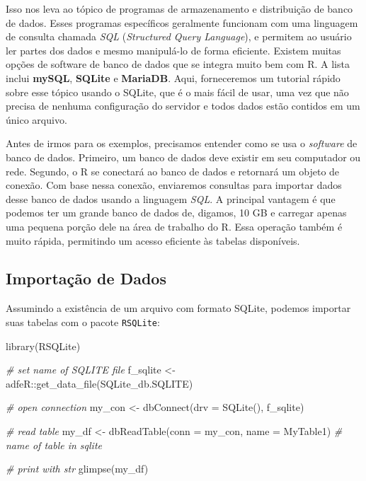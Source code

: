 \documentclass[
  11pt,
]{book}
\newenvironment{Shaded}{\begin{snugshade}}{\end{snugshade}}
\newcommand{\AttributeTok}[1]{\textcolor[rgb]{0.61,0.61,0.61}{#1}}
\newcommand{\CommentTok}[1]{\textcolor[rgb]{0.37,0.37,0.37}{\textit{#1}}}
\newcommand{\FunctionTok}[1]{\textcolor[rgb]{0,0,0}{#1}}
\newcommand{\NormalTok}[1]{#1}
\newcommand{\OtherTok}[1]{\textcolor[rgb]{0.37,0.37,0.37}{#1}}
\newcommand{\SpecialCharTok}[1]{\textcolor[rgb]{0,0,0}{#1}}
\newcommand{\StringTok}[1]{\textcolor[rgb]{0.5,0.5,0.5}{#1}}
\begin{document}
Isso nos leva ao tópico de programas de armazenamento e distribuição de banco de dados. Esses programas específicos geralmente funcionam com uma linguagem de consulta chamada \emph{SQL} (\emph{Structured Query Language}), e permitem ao usuário ler partes dos dados e mesmo manipulá-lo de forma eficiente. Existem muitas opções de software de banco de dados que se integra muito bem com R. A lista inclui \textbf{mySQL}, \textbf{SQLite} e \textbf{MariaDB}. Aqui, forneceremos um tutorial rápido sobre esse tópico usando o SQLite, que é o mais fácil de usar, uma vez que não precisa de nenhuma configuração do servidor e todos dados estão contidos em um único arquivo.   

Antes de irmos para os exemplos, precisamos entender como se usa o \emph{software} de banco de dados. Primeiro, um banco de dados deve existir em seu computador ou rede. Segundo, o R se conectará ao banco de dados e retornará um objeto de conexão. Com base nessa conexão, enviaremos consultas para importar dados desse banco de dados usando a linguagem \emph{SQL}. A principal vantagem é que podemos ter um grande banco de dados de, digamos, 10 GB e carregar apenas uma pequena porção dele na área de trabalho do R. Essa operação também é muito rápida, permitindo um acesso eficiente às tabelas disponíveis.

\hypertarget{importauxe7uxe3o-de-dados-4}{%
\subsection{Importação de Dados}\label{importauxe7uxe3o-de-dados-4}}

Assumindo a existência de um arquivo com formato SQLite, podemos importar suas tabelas com o pacote \texttt{RSQLite}:  

\begin{Shaded}
\begin{Highlighting}[]
\FunctionTok{library}\NormalTok{(RSQLite)}

\CommentTok{\# set name of SQLITE file}
\NormalTok{f\_sqlite }\OtherTok{\textless{}{-}}\NormalTok{ adfeR}\SpecialCharTok{::}\FunctionTok{get\_data\_file}\NormalTok{(}\StringTok{\textquotesingle{}SQLite\_db.SQLITE\textquotesingle{}}\NormalTok{)}

\CommentTok{\# open connection}
\NormalTok{my\_con }\OtherTok{\textless{}{-}} \FunctionTok{dbConnect}\NormalTok{(}\AttributeTok{drv =} \FunctionTok{SQLite}\NormalTok{(), f\_sqlite)}

\CommentTok{\# read table}
\NormalTok{my\_df }\OtherTok{\textless{}{-}} \FunctionTok{dbReadTable}\NormalTok{(}\AttributeTok{conn =}\NormalTok{ my\_con,}
                     \AttributeTok{name =} \StringTok{\textquotesingle{}MyTable1\textquotesingle{}}\NormalTok{) }\CommentTok{\# name of table in sqlite}

\CommentTok{\# print with str}
\FunctionTok{glimpse}\NormalTok{(my\_df)}
\end{Highlighting}
\end{Shaded}
\end{document}

